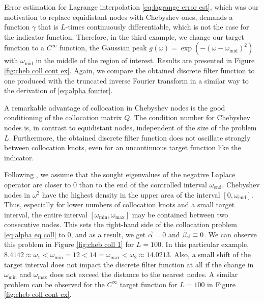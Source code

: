 \documentclass[a4paper,11pt,bibliography=totoc,listof=totoc,headinclude=true,cleardoublepage=empty,oneside]{scrbook}
\newcommand{\dffv}{\Tilde{\beta}_{\Vec{\alpha}}}
\newcommand{\e}{\mathrm{end}}
\begin{document}

Error estimation for Lagrange interpolation \eqref{eq:lagrange error est}, which was our motivation to replace equidistant nodes with Chebyshev ones, demands a function $\gamma$ that is $L$-times continuously differentiable, which is not the case for the indicator function. Therefore, in the third example, we change our target function to a $C^\infty$ function, the Gaussian peak $g(\omega) = \exp\left(-(\omega-\omega_{\mathrm{mid}})^2\right)$ with $\omega_{\mathrm{mid}}$ in the middle of the region of interest. Results are presented in Figure \ref{fig:cheb coll cont ex}. Again, we compare the obtained discrete filter function to one produced with the truncated inverse Fourier transform in a similar way to the derivation of \eqref{eq:alpha fourier}.

A remarkable advantage of collocation in Chebyshev nodes is the good conditioning of the collocation matrix $Q$. The condition number for Chebyshev nodes is, in contrast to equidistant nodes, independent of the size of the problem $L$. Furthermore, the obtained discrete filter function does not oscillate strongly between collocation knots, even for an uncontinuous target function like the indicator.

Following \cite{nannen}, we assume that the sought eigenvalues of the negative Laplace operator are closer to 0 than to the end of the controlled interval $\omega_\e$. Chebyshev nodes in $\omega^2$ have the highest density in the upper area of the interval $[0, \omega_\e]$. Thus, especially for lower numbers of collocation knots and a small target interval, the entire interval $\left[\omega_{\min}, \omega_{\max} \right]$ may be contained between two consecutive nodes. This sets the right-hand side of the collocation problem \eqref{eq:alpha eq coll} to 0, and as a result, we get $\Vec{\alpha}=0$ and $\dffv \equiv 0$. We can observe this problem in Figure \ref{fig:cheb coll 1} for $L=100$. In this particular example, $ 8.4142\approx\omega_1 < \omega_{\min} = 12 < 14 = \omega_{\max} < \omega_2 \approx 14.0213 $. Also, a small shift of the target interval does not impact the discrete filter function at all if the change in $\omega_{\min}$ and $\omega_{\max}$ does not exceed the distance to the nearest nodes. A similar problem can be observed for the $C^\infty$ target function for $L=100$ in Figure \ref{fig:cheb coll cont ex}.
\end{document}
